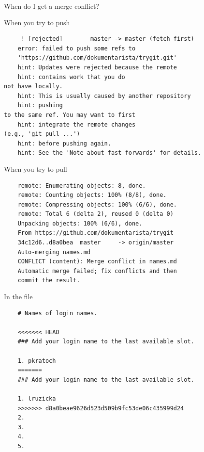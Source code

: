 \documentclass[14pt]{beamer}
\begin{document}
	\begin{frame}{When do I get a merge conflict?}
	\begin{center}
	\end{center}
	\end{frame}


	\begin{frame}[fragile]{When you try to push}
	\begin{verbatim}
	 ! [rejected]        master -> master (fetch first)
	error: failed to push some refs to 
	'https://github.com/dokumentarista/trygit.git'
	hint: Updates were rejected because the remote 
	hint: contains work that you do
not have locally. 
	hint: This is usually caused by another repository 
	hint: pushing
to the same ref. You may want to first 
	hint: integrate the remote changes
(e.g., 'git pull ...')
	hint: before pushing again.
	hint: See the 'Note about fast-forwards' for details.
	\end{verbatim}
	\end{frame}

	\begin{frame}[fragile]{When you try to pull}
	\begin{verbatim}
	remote: Enumerating objects: 8, done.
	remote: Counting objects: 100% (8/8), done.
	remote: Compressing objects: 100% (6/6), done.
	remote: Total 6 (delta 2), reused 0 (delta 0) 
	Unpacking objects: 100% (6/6), done.
	From https://github.com/dokumentarista/trygit
	34c12d6..d8a0bea  master     -> origin/master
	Auto-merging names.md
	CONFLICT (content): Merge conflict in names.md
	Automatic merge failed; fix conflicts and then 
	commit the result.
	\end{verbatim}
\end{frame}

	\begin{frame}[fragile]{In the file}
	\begin{verbatim}
	# Names of login names.
	
	<<<<<<< HEAD                                                                                                           
	### Add your login name to the last available slot.
	
	1. pkratoch
	=======
	### Add your login name to the last available slot.
	
	1. lruzicka
	>>>>>>> d8a0beae9626d523d509b9fc53de06c435999d24
	2.
	3.
	4.
	5.
	\end{verbatim}
	\end{frame}
\end{document}
